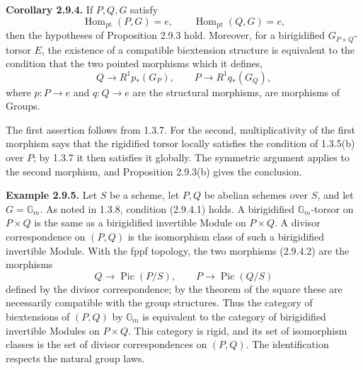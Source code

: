 \documentclass[11pt]{article}
\providecommand{\Pic}{\operatorname{Pic}}
\begin{document}
\textbf{Corollary 2.9.4.}  If \(P,Q,G\) satisfy
\begin{equation}\tag{2.9.4.1}
  \operatorname{Hom}_{\mathrm{pt}}(P,G)=e,
  \qquad
  \operatorname{Hom}_{\mathrm{pt}}(Q,G)=e,
\end{equation}
then the hypotheses of Proposition 2.9.3 hold.  Moreover, for a birigidified \(G_{P\times Q}\)-torsor \(E\), the existence of a compatible biextension structure is equivalent to the condition that the two pointed morphisms which it defines,
\begin{equation}\tag{2.9.4.2}
  Q\longrightarrow R^1p_*(G_{P}),
  \qquad
  P\longrightarrow R^1q_*(G_{Q}),
\end{equation}
where \(p:P\to e\) and \(q:Q\to e\) are the structural morphisms, are morphisms of Groups.

The first assertion follows from 1.3.7.  For the second, multiplicativity of the first morphism says that the rigidified torsor locally satisfies the condition of 1.3.5(b) over \(P\); by 1.3.7 it then satisfies it globally.  The symmetric argument applies to the second morphism, and Proposition 2.9.3(b) gives the conclusion.

\textbf{Example 2.9.5.}  Let \(S\) be a scheme, let \(P,Q\) be abelian schemes over \(S\), and let \(G=\mathbb G_m\).  As noted in 1.3.8, condition (2.9.4.1) holds.  A birigidified \(\mathbb G_m\)-torsor on \(P\times Q\) is the same as a birigidified invertible Module on \(P\times Q\).  A divisor correspondence on \((P,Q)\) is the isomorphism class of such a birigidified invertible Module.  With the fppf topology, the two morphisms (2.9.4.2) are the morphisms
\begin{equation}\tag{2.9.5.1}
  Q\longrightarrow \Pic(P/S),
  \qquad
  P\longrightarrow \Pic(Q/S)
\end{equation}
defined by the divisor correspondence; by the theorem of the square these are necessarily compatible with the group structures.  Thus the category of biextensions of \((P,Q)\) by \(\mathbb G_m\) is equivalent to the category of birigidified invertible Modules on \(P\times Q\).  This category is rigid, and its set of isomorphism classes is the set of divisor correspondences on \((P,Q)\).  The identification respects the natural group laws.
\end{document}
